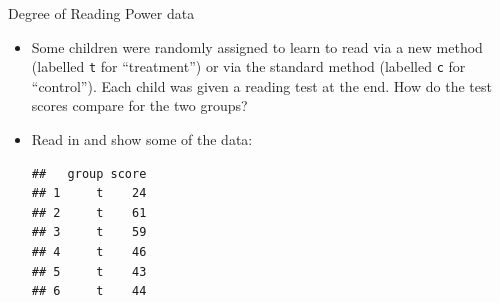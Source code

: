 \begin{frame}[fragile]{Degree of Reading Power data}
  
  \begin{itemize}
  \item Some children were randomly assigned to learn to read via a
    new method (labelled \texttt{t} for ``treatment'') or via the
    standard method (labelled \texttt{c} for ``control''). Each child
    was given a reading test at the end. How do the test scores
    compare for the two groups?
    

  \item Read in and show some of the data:
    
\begin{knitrout}
\color{fgcolor}\begin{kframe}
\begin{alltt}
\hlkwb{=}\hlstd{(}\hlstd{,}
\end{alltt}
\begin{verbatim}
##   group score
## 1     t    24
## 2     t    61
## 3     t    59
## 4     t    46
## 5     t    43
## 6     t    44
\end{verbatim}
\end{kframe}
\end{knitrout}
  \end{itemize}
  
\end{frame}

